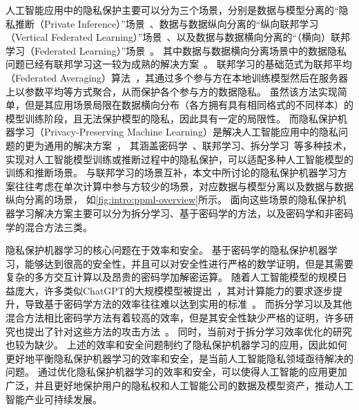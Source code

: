 人工智能应用中的隐私保护主要可以分为三个场景，分别是数据与模型分离的“隐私推断（Private Inference）”场景~\cite{mann_2023_secure_inference}、数据与数据纵向分离的“纵向联邦学习（Vertical Federated Learning）”场景~\cite{liu2024vertical}、以及数据与数据横向分离的“（横向）联邦学习（Federated Learning）”场景~\cite{yangqiang2019federated}。
%
%
其中数据与数据横向分离场景中的数据隐私问题已经有联邦学习这一较为成熟的解决方案~\cite{yangqiang2019federated}。
联邦学习的基础范式为联邦平均（Federated Averaging）算法~\cite{mcmahan_2017_fedavg}，其通过多个参与方在本地训练模型然后在服务器上以参数平均等方式聚合，从而保护各个参与方的数据隐私。
%
虽然该方法实现简单，但是其应用场景局限在数据横向分布（各方拥有具有相同格式的不同样本）的模型训练阶段，且无法保护模型的隐私，因此具有一定的局限性。
%
而隐私保护机器学习（Privacy-Preserving Machine Learning）是解决人工智能应用中的隐私问题的更为通用的解决方案~\cite{al_2019_ppml,xu_2021_ppml}，
其涵盖密码学~\cite{evans_2018_pragmatic_mpc}、联邦学习、拆分学习~\cite{vepakomma2018split}等多种技术，实现对人工智能模型训练或推断过程中的隐私保护，可以适配多种人工智能模型的训练和推断场景。
%
与联邦学习的场景互补，本文中所讨论的隐私保护机器学习方案往往考虑在单次计算中参与方较少的场景，对应数据与模型分离以及数据与数据纵向分离的场景，
如\autoref{fig:intro:ppml-overview}所示。
%
面向这些场景的隐私保护机器学习解决方案主要可以分为拆分学习、基于密码学的方法，以及密码学和非密码学的混合方法三类。
%

隐私保护机器学习的核心问题在于效率和安全。
%
基于密码学的隐私保护机器学习，能够达到很高的安全性，并且可以对安全性进行严格的数学证明，但是其需要复杂的多方交互计算以及昂贵的密码学加解密运算。
随着人工智能模型的规模日益庞大，许多类似ChatGPT的大规模模型被提出~\cite{chatgpt,touvron_2023_llama,duzhengxiao_2022_glm}，其对计算能力的要求逐步提升，导致基于密码学方法的效率往往难以达到实用的标准~\cite{hou2023ciphergpt}。
%
而拆分学习以及其他混合方法相比密码学方法有着较高的效率，但是其安全性缺少严格的证明，许多研究也提出了针对这些方法的攻击方法~\cite{hezecheng_2019_model_inversion_attack,abuadbba2020can_split,wong_2020_lwe_model}。
同时，当前对于拆分学习效率优化的研究也较为缺少。
%
上述的效率和安全问题制约了隐私保护机器学习的应用，因此如何更好地平衡隐私保护机器学习的效率和安全，是当前人工智能隐私领域亟待解决的问题。
%
通过优化隐私保护机器学习的效率和安全，可以使得人工智能的应用更加广泛，并且更好地保护用户的隐私权和人工智能公司的数据及模型资产，推动人工智能产业可持续发展。


